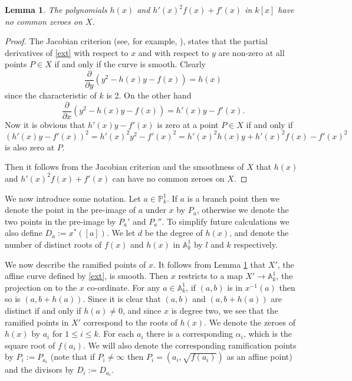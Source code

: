 \documentclass[11pt]{article} %
\theoremstyle{plain}
\newtheorem{lem}[defn]{Lemma}
\theoremstyle{remark}
\begin{document}
\begin{lem}\label{smoothness}
The polynomials $h(x)$ and $h'(x)^2 f(x) + f'(x)$ in $k[x]$ have no common zeroes on $X$.
\end{lem}
\begin{proof}
 The Jacobian criterion (see, for example, \cite[Thm. 2.19]{liu}), states that the partial derivatives of \eqref{ext} with respect to $x$ and with respect to $y$ are non-zero at all points $P\in X$ if and only if the curve is smooth.
 Clearly \[
          \frac{\partial}{\partial y} (y^2 -h(x)y -f(x)) = h(x)
         \]
 since the characteristic of $k$ is 2.
 On the other hand
 \begin{equation*}\label{xderivative}
  \frac{\partial}{\partial x} (y^2 - h(x)y -f(x)) = h'(x)y - f'(x).
 \end{equation*}
Now it is obvious that $h'(x)y - f'(x)$ is zero at a point $P\in X$ if and only if
\[
 (h'(x)y-f'(x))^2 = h'(x)^2y^2 -f'(x)^2 = h'(x)^2h(x)y + h'(x)^2f(x) - f'(x)^2
 \]
is also zero at $P$.

 Then it follows from the Jacobian criterion and the smoothness of $X$ that $h(x)$ and $h'(x)^2f(x) + f'(x)$ can have no common zeroes on $X$. 
\end{proof}


We now introduce some notation.
Let $a\in \mathbb P_k^1$.
If $a$ is a branch point then we denote the point in the pre-image of $a$ under $x$ by $P_a$, otherwise we denote the two points in the pre-image by $P_a'$ and $P_a''$.
To simplify future calculations we also define $D_a := x^*([a])$.
We let $d$ be the degree of $h(x)$, and denote the number of distinct roots of $f(x)$ and $h(x)$ in $\mathbb A_k^1$ by $l$ and $k$ respectively.



We now describe the ramified points of $x$.
It follows from Lemma \ref{smoothness} that $X'$, the affine curve defined by \eqref{ext}, is smooth.
Then $x$ restricts to a map $X'\rightarrow \mathbb A^1_k$, the projection on to the $x$ co-ordinate.
For any $a\in \mathbb A_k^1$, if $(a,b)$ is in $x^{-1}(a)$ then so is $(a,b+h(a))$.
Since it is clear that $(a,b)$ and $(a,b+h(a))$ are distinct if and only if $h(a)\neq 0$, and
since $x$ is degree two, we see that the ramified points in $X'$ correspond to the roots of $h(x)$.
We denote the zeroes of $h(x)$ by $a_i$ for $1\leq i \leq k$.
For each $a_i$ there is a corresponding $\alpha_i$, which is the square root of $f(a_i)$.
We will also denote the corresponding ramification points by $P_i := P_{a_i}$ (note that if $P_i \neq \infty$ then $P_i = (a_i,\sqrt {f(a_i)})$ as an affine point) and the divisors by $D_i:=D_{a_i}$.
\end{document}

